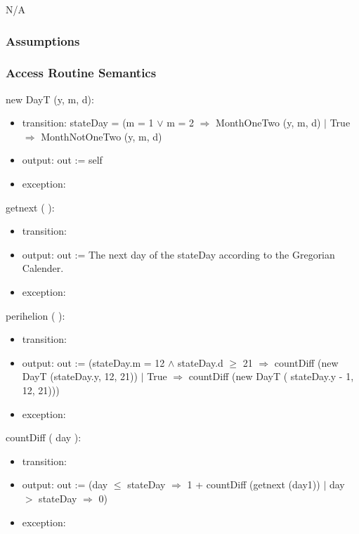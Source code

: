 \documentclass[12pt, titlepage]{article}
\begin{document}
N/A\\

\subsubsection{Assumptions}


\subsubsection{ Access Routine Semantics}

\noindent  new DayT (y, m, d):
\begin{itemize}
\item transition:  stateDay = (m = 1 $\lor$ m = 2 $\Rightarrow$ MonthOneTwo (y, m, d) $|$ True $\Rightarrow$ MonthNotOneTwo (y, m, d)\\

\item output: out := self
\item exception: 
\end{itemize}

\noindent  getnext ( ):
\begin{itemize}
\item transition: 
\item output: out := The next day of the  stateDay according to the Gregorian Calender.
\item exception:
\end{itemize}

\noindent  perihelion ( ):
\begin{itemize}
\item transition: 
\item output: out := (stateDay.m = 12 $	\wedge$ stateDay.d $\geq	$ 21 $\Rightarrow$  countDiff (new DayT (stateDay.y, 12, 21)) $|$ True $\Rightarrow$ countDiff (new DayT ( stateDay.y - 1, 12, 21)))
\item exception:
\end{itemize}

\noindent  countDiff ( day ):
\begin{itemize}
\item transition: 
\item output: out := (day $\leq$ stateDay $\Rightarrow$ 1 + countDiff (getnext (day1)) $|$ day $>$  stateDay $\Rightarrow$ 0)
\item exception:
\end{itemize}
\end{document}

